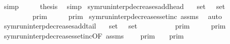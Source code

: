 \begin{isabellebody}
\ simp\isanewline
\ \ \isamarkupfalse%
\ \isamarkupfalse%
\ {\isacharquery}thesis\ \isamarkupfalse%
\ simp\isanewline
{}\isamarkupfalse%
%
\endisatagproof
{\isafoldproof}%
%
\isadelimproof
\isanewline
%
\endisadelimproof
\isanewline
{}\isamarkupfalse%
\ symrun{\isacharunderscore}interp{\isacharunderscore}decreases{\isacharunderscore}add{\isacharunderscore}head{\isacharcolon}\isanewline
\ \ \ {\isacartoucheopen}set\ {\isasymGamma}\ {\isasymsubseteq}\ set\ {\isasymGamma}{\isacharprime}{\isacartoucheclose}\isanewline
\ \ \ \ \ {\isacartoucheopen}{\isasymlbrakk}{\isasymlbrakk}\ {\isasymgamma}\ {\isacharhash}\ {\isasymGamma}\ {\isasymrbrakk}{\isasymrbrakk}\isactrlsub p\isactrlsub r\isactrlsub i\isactrlsub m\ {\isasymsupseteq}\ {\isasymlbrakk}{\isasymlbrakk}\ {\isasymgamma}\ {\isacharhash}\ {\isasymGamma}{\isacharprime}\ {\isasymrbrakk}{\isasymrbrakk}\isactrlsub p\isactrlsub r\isactrlsub i\isactrlsub m{\isacartoucheclose}\isanewline
%
\isadelimproof
%
\endisadelimproof
%
\isatagproof
{}\isamarkupfalse%
\ symrun{\isacharunderscore}interp{\isacharunderscore}decreases{\isacharunderscore}setinc\ assms\ \isamarkupfalse%
\ auto%
\endisatagproof
{\isafoldproof}%
%
\isadelimproof
\isanewline
%
\endisadelimproof
\isanewline
{}\isamarkupfalse%
\ symrun{\isacharunderscore}interp{\isacharunderscore}decreases{\isacharunderscore}add{\isacharunderscore}tail{\isacharcolon}\isanewline
\ \ \ {\isacartoucheopen}set\ {\isasymGamma}\ {\isasymsubseteq}\ set\ {\isasymGamma}{\isacharprime}{\isacartoucheclose}\isanewline
\ \ \ \ \ {\isacartoucheopen}{\isasymlbrakk}{\isasymlbrakk}\ {\isasymGamma}\ {\isacharat}\ {\isacharbrackleft}{\isasymgamma}{\isacharbrackright}\ {\isasymrbrakk}{\isasymrbrakk}\isactrlsub p\isactrlsub r\isactrlsub i\isactrlsub m\ {\isasymsupseteq}\ {\isasymlbrakk}{\isasymlbrakk}\ {\isasymGamma}{\isacharprime}\ {\isacharat}\ {\isacharbrackleft}{\isasymgamma}{\isacharbrackright}\ {\isasymrbrakk}{\isasymrbrakk}\isactrlsub p\isactrlsub r\isactrlsub i\isactrlsub m{\isacartoucheclose}\isanewline
%
\isadelimproof
%
\endisadelimproof
%
\isatagproof
{}\isamarkupfalse%
\ {\isacharminus}\isanewline
\ \ \isamarkupfalse%
\ symrun{\isacharunderscore}interp{\isacharunderscore}decreases{\isacharunderscore}setinc{\isacharbrackleft}OF\ assms{\isacharbrackright}\ \isamarkupfalse%
\ {\isacartoucheopen}{\isasymlbrakk}{\isasymlbrakk}\ {\isasymGamma}{\isacharprime}\ {\isasymrbrakk}{\isasymrbrakk}\isactrlsub p\isactrlsub r\isactrlsub i\isactrlsub m\ {\isasymsubseteq}\ {\isasymlbrakk}{\isasymlbrakk}\ {\isasymGamma}\ {\isasymrbrakk}{\isasymrbrakk}\isactrlsub p\isactrlsub r\isactrlsub i\isactrlsub m{\isacartoucheclose}\ \isacommand{{\isachardot}}\isamarkupfalse%

\end{isabellebody}
